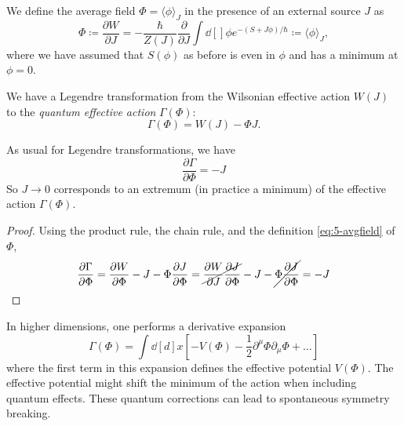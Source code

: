 \begin{definition}[]
  We define the average field $\Phi = \langle \phi \rangle_J$ in the presence of an external source $J$ as
  \begin{equation}
    \label{eq:5-avgfield}
    \Phi \coloneqq \frac{\partial W}{\partial J} = -\frac{\hbar}{Z(J)} \frac{\partial }{\partial J} \int \dd[]{\phi} e^{-(S + J \phi) / \hbar} \coloneqq \langle \phi \rangle_J,
  \end{equation}
  where we have assumed that $S(\phi)$ as before is even in $\phi$ and has a minimum at $\phi = 0$.
\end{definition}
\begin{definition}
  We have a Legendre transformation from the Wilsonian effective action $W(J)$ to the \emph{quantum effective action} $\Gamma(\Phi)$:
  \begin{equation}
    \label{eq:qee}
    \Gamma(\Phi) = W(J) - \Phi J.
  \end{equation}
\end{definition}
\begin{claim}
  As usual for Legendre transformations, we have  
  \begin{equation}
     \boxed{\frac{\partial \Gamma}{\partial \Phi} = - J}
  \end{equation}
  So $J \to 0$ corresponds to an extremum (in practice a minimum) of the effective action $\Gamma(\Phi)$.
\end{claim}
\begin{proof}
  Using the product rule, the chain rule, and the definition \eqref{eq:5-avgfield} of $\Phi$, 
  \begin{equation}
    \frac{\partial \Gamma}{\partial \Phi} = \frac{\partial W}{\partial \Phi} - J - \Phi \frac{\partial J}{\partial \Phi}
    = \cancel{\frac{\partial W}{\partial J} \frac{\partial J}{\partial \Phi}} - J - \cancel{\Phi \frac{\partial J}{\partial \Phi}}
    = -J
  \end{equation}
\end{proof}

\begin{leftbar}
  In higher dimensions, one performs a derivative expansion
  \begin{equation}
    \Gamma(\Phi) = \int \dd[d]{x} \left[ -V(\Phi) -\frac{1}{2} \partial^{\mu} \Phi \partial_{\mu} \Phi + \dots \right]
  \end{equation}
  where the first term in this expansion defines the effective potential $V(\Phi)$.
  The effective potential might shift the minimum of the action when including quantum effects. These quantum corrections can lead to spontaneous symmetry breaking.
\end{leftbar}

